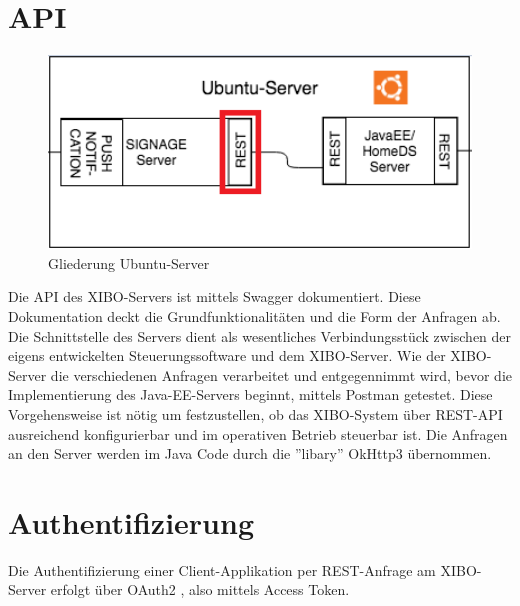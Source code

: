 \section{API}
\begin{figure}[H]
\centering
\includegraphics[width=1.0\textwidth]{images/03_XIBO-Server/03_XiboApi}
\caption{Gliederung Ubuntu-Server}
\label{fig:structXibo}
\end{figure}
Die API des XIBO-Servers ist mittels Swagger dokumentiert. Diese Dokumentation deckt die Grundfunktionalitäten und die Form der Anfragen ab. Die Schnittstelle des Servers dient als wesentliches Verbindungsstück zwischen der eigens entwickelten Steuerungssoftware und dem XIBO-Server. Wie der XIBO-Server die verschiedenen Anfragen verarbeitet und entgegennimmt wird, bevor die Implementierung des Java-EE-Servers beginnt, mittels Postman getestet. Diese Vorgehensweise ist nötig um festzustellen, ob das XIBO-System über REST-API ausreichend konfigurierbar und im operativen Betrieb steuerbar ist. Die Anfragen an den Server werden im Java Code durch die ''libary'' OkHttp3 übernommen.\cite{swagger}\cite{postman}\cite{OkHttp3}

\section{Authentifizierung}
Die Authentifizierung einer Client-Applikation per REST-Anfrage am XIBO-Server erfolgt über OAuth2 , also mittels Access Token. \cite{oAuth2}

